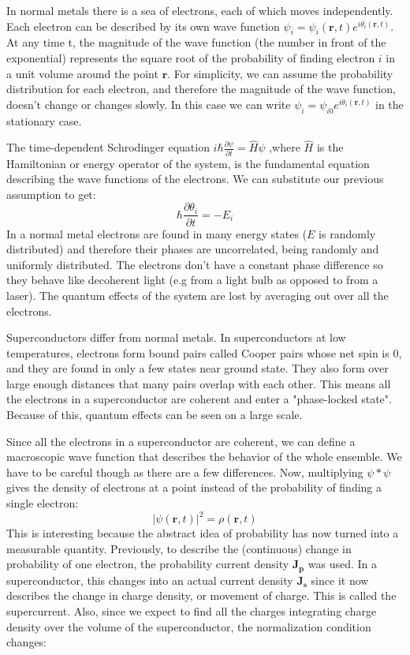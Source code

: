 \documentclass[conf]{new-aiaa}
\begin{document}
In normal metals there is a sea of electrons, each of which moves independently. Each electron can be described by its own wave function $\psi_i = \psi_i(\mathbf{r},t)e^{i\theta_i(\mathbf{r},t)}$. At any time t, the magnitude of the wave function (the number in front of the exponential) represents the square root of the probability of finding electron $i$ in a unit volume around the point $\mathbf{r}$. For simplicity, we can assume the probability distribution for each electron, and therefore the magnitude of the wave function, doesn't change or changes slowly. In this case we can write $\psi_i = \psi_{i0}e^{i\theta_i(\mathbf{r},t)}$ in the stationary case.\par 
The time-dependent Schrodinger equation $i\hbar\frac{\partial \psi}{\partial t} = \hat{H} \psi$ ,where $\hat{H}$ is the Hamiltonian or energy operator of the system, is the fundamental equation describing the wave functions of the electrons. We can substitute our previous assumption to get: $$\hbar\frac{\partial \theta_i}{\partial t} = -E_i$$
In a normal metal electrons are found in many energy states ($E$ is randomly distributed) and therefore their phases are uncorrelated, being randomly and uniformly distributed. The electrons don't have a constant phase difference so they behave like decoherent light (e.g from a light bulb as opposed to from a laser). The quantum effects of the system are lost by averaging out over all the electrons. \par
Superconductors differ from normal metals. In superconductors at low temperatures, electrons form bound pairs called Cooper pairs whose net spin is 0, and they are found in only a few states near ground state. They also form over large enough distances that many pairs overlap with each other. This means all the electrons in a superconductor are coherent and enter a "phase-locked state". Because of this, quantum effects can be seen on a large scale. \par
Since all the electrons in a superconductor are coherent, we can define a macroscopic wave function that describes the behavior of the whole ensemble. We have to be careful though as there are a few differences. Now, multiplying $\psi * \psi$ gives the density of electrons at a point instead of the probability of finding a single electron: 
$${|\psi(\mathbf{r},t)|}^2 = \rho(\mathbf{r},t)$$ 
This is interesting because the abstract idea of probability has now turned into a measurable quantity. Previously, to describe the (continuous) change in probability of one electron, the probability current density $\mathbf{J_p}$ was used. In a superconductor, this changes into an actual current density $\mathbf{J_s}$ since it now describes the change in charge density, or movement of charge. This is called the supercurrent. Also, since we expect to find all the charges integrating charge density over the volume of the superconductor, the normalization condition changes: 
\end{document}
